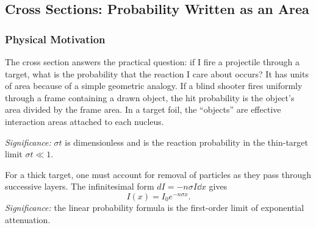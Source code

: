 
\subsection{Cross Sections: Probability Written as an Area}
\label{subsec:lec10:cross_sections}

\subsubsection*{Physical Motivation}
The cross section answers the practical question: if I fire a projectile through
a target, what is the probability that the reaction I care about occurs? It has
units of area because of a simple geometric analogy. If a blind shooter fires
uniformly through a frame containing a drawn object, the hit probability is the
object's area divided by the frame area. In a target foil, the ``objects'' are
effective interaction areas attached to each nucleus.

\textit{Significance:} $\sigma t$ is dimensionless and is the reaction
probability in the thin-target limit $\sigma t\ll1$.

For a thick target, one must account for removal of particles as they pass
through successive layers. The infinitesimal form
$dI=-n\sigma I\dd{x}$ gives
\begin{equation}
  \label{eq:lec10:attenuation}
  \boxed{I(x)=I_0 e^{-n\sigma x}.}
\end{equation}
\textit{Significance:} the linear probability formula is the first-order limit
of exponential attenuation.

